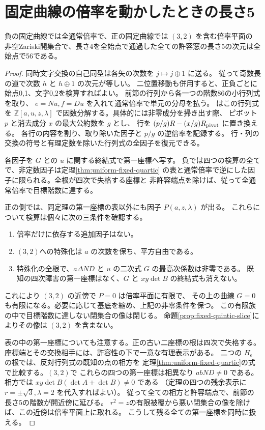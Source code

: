 \section{固定曲線の倍率を動かしたときの長さ5}
\label{sec:varying-fixed-quintics}
\begin{theorem}\label{thm:varying-fixed-quintics}
負の固定曲線では全通常倍率で、正の固定曲線では $(3,2)$ を含む倍率平面の
非空Zariski開集合で、長さ4を全始点で通過した全ての許容窓の長さ5の次元は全始点で56である。
\end{theorem}
\begin{proof}
同時文字交換の自己同型は各矢の次数を $j\mapsto j\mathbin\oplus1$ に送る。
従って奇数長の道で次数 $h$ と $h\mathbin\oplus1$ の次元が等しい。
二位置移動も併用すると、正負ごとに始点0,1、文字0,2を検算すればよい。
前節の行列から各一つの階数86の小行列式を取り、
$e=Nu,f=Du$ を入れて通常倍率で単元の分母を払う。
 はこの行列式を
$\mathbb Z[a,u,z,\lambda]$ で因数分解する。具体的には非零成分を掃き出す際、
ピボット $p$ と消去成分 $x$ の最大公約数を $g$ とし、
行を $(p/g)R-(x/g)R_{\rm pivot}$ に置き換える。
各行の内容を割り、取り除いた因子と $p/g$ の逆倍率を記録する。
行・列の交換の符号と有理定数を除いた行列式の全因子を復元できる。

各因子を $G$ との $u$ に関する終結式で第一座標へ写す。
負では四つの検算の全てで、非定数因子は定理\ref{thm:uniform-fixed-quartic}
の表と通常倍率で逆にした因子に限られる。全根が四次で失格する座標と
非許容端点を除けば、従って全通常倍率で目標階数に達する。

正の側では、同定理の第一座標の表以外にも因子 $P(a,z,\lambda)$ が出る。
これらについて検算は個々に次の三条件を確認する。
\begin{enumerate}
\item 倍率だけに依存する追加因子はない。
\item $(3,2)$への特殊化は $a$ の次数を保ち、平方自由である。
\item 特殊化の全根で、$a\Delta ND$ と $u$ の二次式 $G$ の最高次係数は非零である。
既知の四次障害の第一座標はなく、$G$ と $xy\det B$ の終結式も消えない。
\end{enumerate}
これにより $(3,2)$ の近傍で $P=0$ は倍率平面に有限で、
その上の曲線 $G=0$ も有限になる。必要に応じて基底を縮め、上記の非零条件を保つ。
この有限族の中で目標階数に達しない閉集合の像は閉じる。
命題\ref{prop:fixed-quintic-slice}によりその像は $(3,2)$ を含まない。

表の中の第一座標についても注意する。正の古い二座標の根は四次で失格する。
座標端とその交換相手には、許容性の下で一意な有理表示がある。
二つの $H_\epsilon$ の根では、反対行列式の既知の点の相方を
定理\ref{thm:uniform-fixed-quartic}の式で比較する。$(3,2)$で
これらの四つの第一座標は相異なり $abND\ne0$ である。
相方では $xy\det B(\det A+\det B)\ne0$ である
（定理の四つの残余表示に $r=\pm\sqrt3,\lambda=2$ を代入すればよい）。
従って全ての相方と許容端点で、前節の長さ5の階数が開近傍に延びる。
$r^2=z$の有限被覆から悪い閉集合の像を除けば、この近傍は倍率平面上に取れる。
こうして残る全ての第一座標を同時に扱える。
\end{proof}
